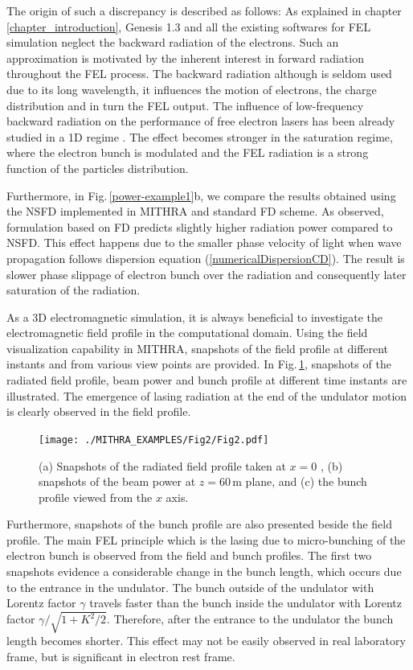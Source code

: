 The origin of such a discrepancy is described as follows:
%
As explained in chapter \ref{chapter_introduction}, Genesis 1.3 and all the existing softwares for FEL simulation neglect the backward radiation of the electrons.
%
Such an approximation is motivated by the inherent interest in forward radiation throughout the FEL process.
%
The backward radiation although is seldom used due to its long wavelength, it influences the motion of electrons, the charge distribution and in turn the FEL output.
%
The influence of low-frequency backward radiation on the performance of free electron lasers has been already studied in a 1D regime \cite{maroli2000effects}.
%
The effect becomes stronger in the saturation regime, where the electron bunch is modulated and the FEL radiation is a strong function of the particles distribution.

Furthermore, in Fig.\,\ref{power-example1}b, we compare the results obtained using the NSFD implemented in MITHRA and standard FD scheme.
%
As observed, formulation based on FD predicts slightly higher radiation power compared to NSFD.
%
This effect happens due to the smaller phase velocity of light when wave propagation follows dispersion equation (\ref{numericalDispersionCD}).
%
The result is slower phase slippage of electron bunch over the radiation and consequently later saturation of the radiation.

As a 3D electromagnetic simulation, it is always beneficial to investigate the electromagnetic field profile in the computational domain.
%
Using the field visualization capability in MITHRA, snapshots of the field profile at different instants and from various view points are provided.
%
In Fig.\,\ref{profile-example1}, snapshots of the radiated field profile, beam power and bunch profile at different time instants are illustrated.
%
The emergence of lasing radiation at the end of the undulator motion is clearly observed in the field profile.
%
\begin{figure}
\centering
\texttt{[image: ./MITHRA\_EXAMPLES/Fig2/Fig2.pdf]}
\caption{(a) Snapshots of the radiated field profile taken at $x=0$ , (b) snapshots of the beam power at $z=60$\,{\textmu}m plane, and (c) the bunch profile viewed from the $x$ axis.}
\label{profile-example1}
\end{figure}
%
Furthermore, snapshots of the bunch profile are also presented beside the field profile.
%
The main FEL principle which is the lasing due to micro-bunching of the electron bunch is observed from the field and bunch profiles.
%
The first two snapshots evidence a considerable change in the bunch length, which occurs due to the entrance in the undulator.
%
The bunch outside of the undulator with Lorentz factor $\gamma$ travels faster than the bunch inside the undulator with Lorentz factor $\gamma/\sqrt{1+K^2/2}$.
%
Therefore, after the entrance to the undulator the bunch length becomes shorter.
%
This effect may not be easily observed in real laboratory frame, but is significant in electron rest frame.


